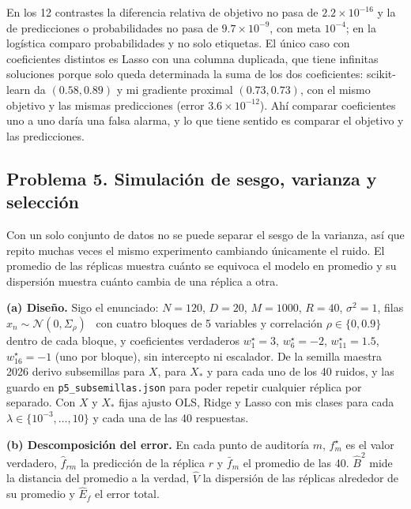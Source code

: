 \documentclass[10pt,a4paper]{article}
\begin{document}
En los 12 contrastes la diferencia relativa de objetivo no pasa de $2.2\times10^{-16}$ y la de predicciones o probabilidades no pasa de $9.7\times10^{-9}$, con meta $10^{-4}$; en la logística comparo probabilidades y no solo etiquetas. El único caso con coeficientes distintos es Lasso con una columna duplicada, que tiene infinitas soluciones porque solo queda determinada la suma de los dos coeficientes: scikit-learn da $(0.58,0.89)$ y mi gradiente proximal $(0.73,0.73)$, con el mismo objetivo y las mismas predicciones (error $3.6\times10^{-12}$). Ahí comparar coeficientes uno a uno daría una falsa alarma, y lo que tiene sentido es comparar el objetivo y las predicciones.

\subsection*{Problema 5. Simulación de sesgo, varianza y selección}
Con un solo conjunto de datos no se puede separar el sesgo de la varianza, así que repito muchas veces el mismo experimento cambiando únicamente el ruido. El promedio de las réplicas muestra cuánto se equivoca el modelo en promedio y su dispersión muestra cuánto cambia de una réplica a otra.

\textbf{(a) Diseño.}
Sigo el enunciado: $N=120$, $D=20$, $M=1000$, $R=40$, $\sigma^2=1$, filas $x_n\sim\mathcal N(0,\Sigma_\rho)$~\cite[secc.~3.2]{pml1} con cuatro bloques de 5 variables y correlación $\rho\in\{0,0.9\}$ dentro de cada bloque, y coeficientes verdaderos $w^\star_1=3$, $w^\star_6=-2$, $w^\star_{11}=1.5$, $w^\star_{16}=-1$ (uno por bloque), sin intercepto ni escalador. De la semilla maestra 2026 derivo subsemillas para $X$, para $X_*$ y para cada uno de los 40 ruidos, y las guardo en \texttt{p5\_subsemillas.json} para poder repetir cualquier réplica por separado. Con $X$ y $X_*$ fijas ajusto OLS, Ridge y Lasso con mis clases para cada $\lambda\in\{10^{-3},\dots,10\}$ y cada una de las 40 respuestas.

\textbf{(b) Descomposición del error.}
En cada punto de auditoría $m$, $f^\star_m$ es el valor verdadero, $\hat f_{rm}$ la predicción de la réplica $r$ y $\bar f_m$ el promedio de las 40. $\hat B^2$ mide la distancia del promedio a la verdad, $\hat V$ la dispersión de las réplicas alrededor de su promedio y $\hat E_f$ el error total.
\end{document}

